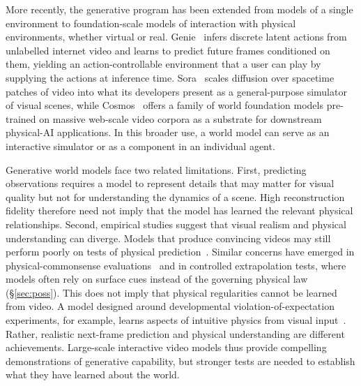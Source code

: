 \documentclass[acmsmall,screen,review,anonymous]{acmart}
\begin{document}
 More recently, the generative program has been extended from models of a single environment to foundation-scale models of interaction with physical environments, whether virtual or real.
%
 Genie~\citep{bruce2024geniegenerativeinteractiveenvironments} infers discrete latent actions from unlabelled internet video and learns to predict future frames conditioned on them, yielding an action-controllable environment that a user can play by supplying the actions at inference time.
%
 Sora~\citep{openaiVideoGeneration, openaiSoraSystem} scales diffusion over spacetime patches of video into what its developers present as a general-purpose simulator of visual scenes, while Cosmos~\citep{nvidia2025cosmosworldfoundationmodel, nvidia2026worldsimulationvideofoundation, nvidia2026cosmos3omnimodalworld} offers a family of world foundation models pre-trained on massive web-scale video corpora as a substrate for downstream physical-AI applications.
%
In this broader use, a world model can serve as an interactive simulator or as a component in an individual agent.
 
Generative world models face two related limitations.
%
First, predicting observations requires a model to represent details that may matter for visual quality but not for understanding the dynamics of a scene.
%
High reconstruction fidelity therefore need not imply that the model has learned the relevant physical relationships.
%
Second, empirical studies suggest that visual realism and physical understanding can diverge.
%
Models that produce convincing videos may still perform poorly on tests of physical prediction~\citep{motamed2026physics}.
%
Similar concerns have emerged in physical-commonsense evaluations~\citep{bansal2025videophy,bansal2026videophy} and in controlled extrapolation tests, where models often rely on surface cues instead of the governing physical law~\citep{kang2025how} (\S\ref{sec:poss}).
%
This does not imply that physical regularities cannot be learned from video.
%
A model designed around developmental violation-of-expectation experiments, for example, learns aspects of intuitive physics from visual input~\citep{Piloto2022IntuitivePL}.
%
Rather, realistic next-frame prediction and physical understanding are different achievements.
%
Large-scale interactive video models thus provide compelling demonstrations of generative capability, but stronger tests are needed to establish what they have learned about the world.
\end{document}
